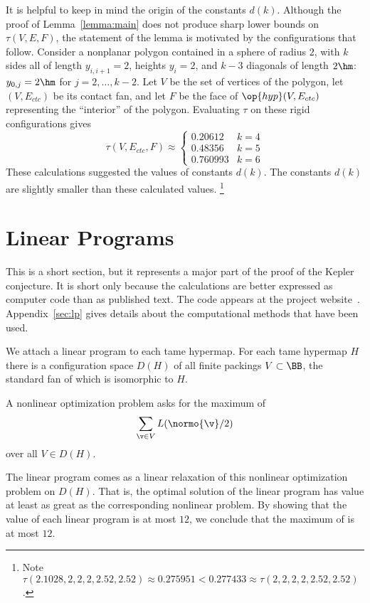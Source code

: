 \begin{remark}
  It is helpful to keep in mind the origin of the constants $d(k)$.
  Although the proof of Lemma~\ref{lemma:main} does not produce sharp
  lower bounds on $\tau(V,E,F)$, the statement of the lemma is
  motivated by the configurations that follow.  Consider a nonplanar
  polygon contained in a sphere of radius $2$, with $k$ sides all of
  length $y_{i,i+1}=2$, heights $y_i=2$, and $k-3$ diagonals of length
  $2\hm$: $y_{0,j}=2\hm$ for $j=2,\ldots,k-2$.  Let $V$ be the set of
  vertices of the polygon, let $(V,E_{ctc})$ be its contact fan, and
  let $F$ be the face of $\op{hyp}(V,E_{ctc})$ representing the
  ``interior'' of the polygon.  Evaluating $\tau$ on these rigid
  configurations gives
\[ 
\tau(V,E_{ctc},F) \approx
\begin{cases}
0.20612 & k=4\\
0.48356 & k=5\\
0.760993 &k=6
\end{cases}
\] 
These calculations suggested the values of constants $d(k)$.  The
constants $d(k)$ are slightly smaller than these calculated values.%
\footnote{Note $\tau(2.1028,2,2,2,2.52,2.52) \approx 0.275951 <
  0.277433 \approx \tau(2,2,2,2,2.52,2.52)$.}  %
%
%
\end{remark}


\section{Linear Programs}\label{sec:tsp}

This is a short section, but it represents a major part of the proof
of the Kepler conjecture.  It is short only because the calculations
are better expressed as computer code than as published text.  The
code appears at the project
website~\cite{website:FlyspeckProject}.  Appendix~\ref{sec:lp} gives
details about the computational methods that have been used.

We attach a linear program to each tame hypermap.  For each tame
hypermap $H$ there is a configuration space $D(H)$ of all finite
packings $V\subset \BB$,  the standard fan of which is isomorphic to $H$.
%
%

A nonlinear optimization problem asks for the maximum of
\begin{equation}\label{eqn:L2}
\sum_{\v\in V} L(\normo{\v}/2)
\end{equation}
over all $V\in D(H)$.

The linear program comes as a linear relaxation of this nonlinear
optimization problem on $D(H)$. That is, the optimal solution of the
linear program has value at least as great as the corresponding
nonlinear problem.  By showing that the value of each linear program
is at most $12$, we conclude that the maximum of  is at
most $12$.




